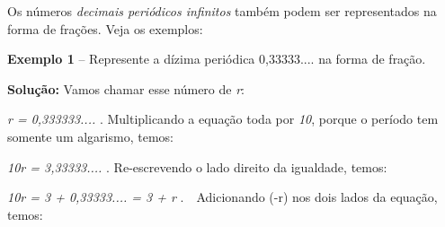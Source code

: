 \documentclass[12pt]{article}
\renewcommand{\_}{\kern-1.5pt\textunderscore\kern-1.5pt}
\begin{document}
\vspace{\baselineskip}
\par 

\vspace{\baselineskip}
\begin{justify}
Os números \textit{decimais periódicos infinitos} também podem ser representados na forma de frações. Veja os exemplos:
\end{justify}\par


\vspace{\baselineskip}
\begin{justify}
\textbf{Exemplo 1} – Represente a dízima periódica 0,33333.... na forma de fração.
\end{justify}\par

\begin{justify}
\textbf{Solução: }Vamos chamar esse número de \textit{r}:
\end{justify}\par

\begin{adjustwidth}{0.69in}{0.0in}
\begin{justify}
\tab \textit{r = 0,333333....} . Multiplicando a equação toda por \textit{10}, porque o período tem somente um algarismo, temos:
\end{justify}\par

\end{adjustwidth}

\begin{adjustwidth}{0.69in}{0.0in}
\begin{justify}
\tab \textit{10r = 3,33333....} . Re-escrevendo o lado direito da igualdade, temos:
\end{justify}\par

\end{adjustwidth}

\begin{adjustwidth}{0.69in}{0.0in}
\begin{justify}
\tab \textit{10r = 3 + 0,33333.... = 3 + r} .\ \  Adicionando (-r) nos dois lados da equação, temos:
\end{justify}\par

\end{adjustwidth}
\end{document}
